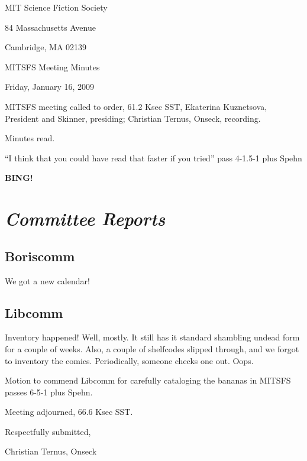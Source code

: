 \documentclass[10pt]{article}
\newcommand{\bing}{{\bf BING!} }
\newcommand{\goto}[1]{\bing \vskip 12pt \section*{{\em{#1}}}}
\newcommand{\ps}{ plus Spehn\xspace}
\begin{document}
\begin{center}

MIT Science Fiction Society

84 Massachusetts Avenue

Cambridge, MA 02139

\vspace{12pt}

MITSFS Meeting Minutes

Friday, January 16, 2009

\end{center}

\vspace{18pt}

\setlength{\parskip}{6pt}

\noindent
MITSFS meeting called to order, 61.2 Ksec SST,
Ekaterina Kuznetsova, President and Skinner, presiding; Christian Ternus, Onseck, recording.

Minutes read.

``I think that you could have read that faster if you tried'' pass 4-1.5-1 \ps

\goto{Committee Reports}

\subsection*{Boriscomm}

We got a new calendar!

\subsection*{Libcomm}

Inventory happened!  Well, mostly.  It still has it standard shambling
undead form for a couple of weeks.  Also, a couple of shelfcodes
slipped through, and we forgot to inventory the comics.  Periodically,
someone checks one out.  Oops.

Motion to commend Libcomm for carefully cataloging the bananas in
MITSFS passes 6-5-1 \ps.

\noindent
Meeting adjourned, 66.6 Ksec SST.

\vspace{18pt}

\centerline{Respectfully submitted,}
\centerline{Christian Ternus, Onseck}
\end{document}
